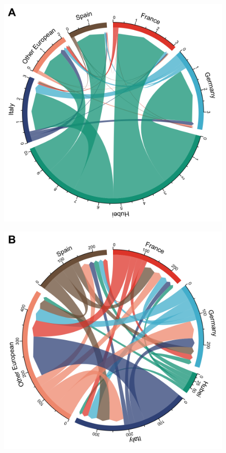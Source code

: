 \documentclass[12pt,]{article}
\begin{document}
\begin{figure}[!tbp]
  \centering

  \begin{minipage}[t]{0.4\textwidth}
  \includegraphics[width=\textwidth]{201014_europe2_figtraj08a.png}
  \label{fig:migs1}
  \end{minipage}
  \begin{minipage}[t]{0.4\textwidth}
  \includegraphics[width=\textwidth]{201014_europe2_figtraj08b.png}

\end{minipage}
\end{figure}
\end{document}
